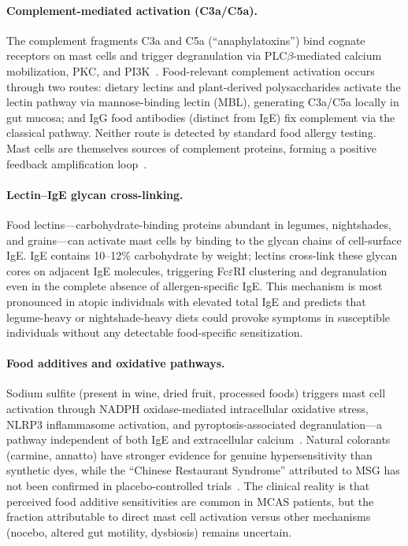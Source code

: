 \paragraph{Complement-mediated activation (C3a/C5a).}
The complement fragments C3a and C5a (``anaphylatoxins'') bind cognate receptors on mast cells and trigger degranulation via PLC$\beta$-mediated calcium mobilization, PKC, and PI3K~\cite{EliehAliKomi2020complement}. Food-relevant complement activation occurs through two routes: dietary lectins and plant-derived polysaccharides activate the lectin pathway via mannose-binding lectin (MBL), generating C3a/C5a locally in gut mucosa; and IgG food antibodies (distinct from IgE) fix complement via the classical pathway. Neither route is detected by standard food allergy testing. Mast cells are themselves sources of complement proteins, forming a positive feedback amplification loop~\cite{EliehAliKomi2020complement}.

\paragraph{Lectin--IgE glycan cross-linking.}
Food lectins---carbohydrate-binding proteins abundant in legumes, nightshades, and grains---can activate mast cells by binding to the glycan chains of cell-surface IgE. IgE contains 10--12\% carbohydrate by weight; lectins cross-link these glycan cores on adjacent IgE molecules, triggering Fc$\varepsilon$RI clustering and degranulation even in the complete absence of allergen-specific IgE. This mechanism is most pronounced in atopic individuals with elevated total IgE and predicts that legume-heavy or nightshade-heavy diets could provoke symptoms in susceptible individuals without any detectable food-specific sensitization.

\paragraph{Food additives and oxidative pathways.}
Sodium sulfite (present in wine, dried fruit, processed foods) triggers mast cell activation through NADPH oxidase-mediated intracellular oxidative stress, NLRP3 inflammasome activation, and pyroptosis-associated degranulation---a pathway independent of both IgE and extracellular calcium~\cite{Pepper2020additives}. Natural colorants (carmine, annatto) have stronger evidence for genuine hypersensitivity than synthetic dyes, while the ``Chinese Restaurant Syndrome'' attributed to MSG has not been confirmed in placebo-controlled trials~\cite{Pepper2020additives}. The clinical reality is that perceived food additive sensitivities are common in MCAS patients, but the fraction attributable to direct mast cell activation versus other mechanisms (nocebo, altered gut motility, dysbiosis) remains uncertain.

